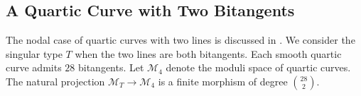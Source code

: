 \documentclass[12pt,reqno,a4paper]{amsart}
\newtheorem{prop}[thm]{Proposition~}
\theoremstyle{remark}
\theoremstyle{definition}
\newcommand{\PP}{\mathbb{P}}
\newcommand{\calM}{\mathcal{M}}
\newcommand{\calV}{\mathcal{V}}
\newcommand\Sym{\mathrm{Sym}}
\begin{document}
\subsection{A Quartic Curve with Two Bitangents}
The nodal case of quartic curves with two lines is discussed in \cite{gallardo2018compactifications}.
We consider the singular type $T$ when the two lines are both bitangents.
Each smooth quartic curve admits $28$ bitangents.
Let $\calM_4$ denote the moduli space of quartic curves.
The natural projection $\calM_T\to \calM_4$ is a finite morphism of degree $\binom{28}{2}$.

\end{document}
